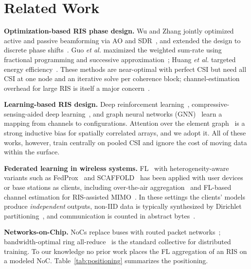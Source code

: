 \documentclass[conference]{IEEEtran}
\begin{document}
\section{Related Work}
\label{sec:related}

\textbf{Optimization-based RIS phase design.} Wu and Zhang jointly optimized active and passive beamforming via AO and SDR~\cite{wu2019joint}, and extended the design to discrete phase shifts~\cite{wu2020discrete}. Guo \emph{et al.} maximized the weighted sum-rate using fractional programming and successive approximation~\cite{guo2020}; Huang \emph{et al.} targeted energy efficiency~\cite{huang2019}. These methods are near-optimal with perfect CSI but need all CSI at one node and an iterative solve per coherence block; channel-estimation overhead for large RIS is itself a major concern~\cite{zheng2022survey}.

\textbf{Learning-based RIS design.} Deep reinforcement learning~\cite{huang2020drl}, compressive-sensing-aided deep learning~\cite{taha2021}, and graph neural networks (GNN)~\cite{shen2021gnn,eisen2020,he2021gnn} learn a mapping from channels to configurations. Attention over the element graph~\cite{velickovic2018} is a strong inductive bias for spatially correlated arrays, and we adopt it. All of these works, however, train centrally on pooled CSI and ignore the cost of moving data within the surface.

\textbf{Federated learning in wireless systems.} FL~\cite{mcmahan2017,kairouz2021} with heterogeneity-aware variants such as FedProx~\cite{li2020fedprox} and SCAFFOLD~\cite{karimireddy2020} has been applied with user devices or base stations as clients, including over-the-air aggregation~\cite{yang2020ota} and FL-based channel estimation for RIS-assisted MIMO~\cite{elbir2022}. In these settings the clients' models produce \emph{independent} outputs, non-IID data is typically synthesized by Dirichlet partitioning~\cite{zhao2018noniid}, and communication is counted in abstract bytes~\cite{konecny2016}.

\textbf{Networks-on-Chip.} NoCs replace buses with routed packet networks~\cite{benini2002,bjerregaard2006,dally2004}; bandwidth-optimal ring all-reduce~\cite{patarasuk2009,sergeev2018} is the standard collective for distributed training. To our knowledge no prior work places the FL aggregation of an RIS on a modeled NoC. Table~\ref{tab:positioning} summarizes the positioning.
\end{document}
